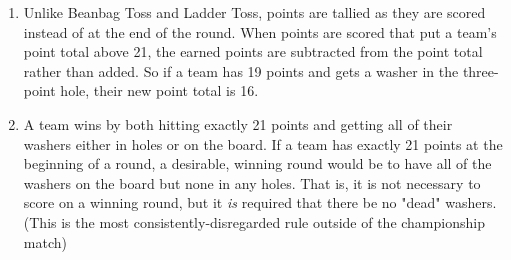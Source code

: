 \documentclass[a4paper]{article}
\begin{document}
\begin{enumerate}
\item Unlike Beanbag Toss and Ladder Toss, points are tallied as they are scored instead of at the end of the round. When points are scored that put a team's point total above 21, the earned points are subtracted from the point total rather than added. So if a team has 19 points and gets a washer in the three-point hole, their new point total is 16.
\item A team wins by both hitting exactly 21 points and getting all of their washers either in holes or on the board. If a team has exactly 21 points at the beginning of a round, a desirable, winning round would be to have all of the washers on the board but none in any holes. That is, it is not necessary to score on a winning round, but it \textit{is} required that there be no "dead" washers. (This is the most consistently-disregarded rule outside of the championship match)
\end{enumerate}
\end{document}
